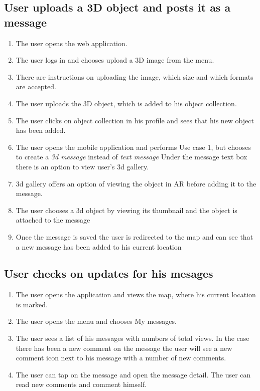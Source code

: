 \documentclass[thesis=M,english]{FITthesis}[2012/10/20]
\begin{document}
\subsection{User uploads a 3D object and posts it as a message}
\begin{enumerate}
	\item The user opens the web application.
	\item The user logs in and chooses upload a 3D image from the menu.
	\item There are instructions on uploading the image, which size and which formats are accepted.
	\item The user uploads the 3D object, which is added to his object collection.
	\item The user clicks on object collection in his profile and sees that his new object has been added.
	\item The user opens the mobile application and performs Use case 1, but chooses to create a \textit{3d message} instead of \textit{text message} Under the message text box there is an option to view user's 3d gallery.
	\item 3d gallery offers an option of viewing the object in AR before adding it to the message.
	\item The user chooses a 3d object by viewing its thumbnail and the object is attached to the message
	\item Once the message is saved the user is redirected to the map and can see that a new message has been added to his current location
\end{enumerate}

\subsection{User checks on updates for his mesages}
\begin{enumerate}
	\item The user opens the application and views the map, where his current location is marked.
	\item The user opens the menu and chooses My messages.
	\item The user sees a list of his messages with numbers of total views. In the case there has been a new comment on the message the user will see a new comment icon next to his message with a number of new comments.
	\item The user can tap on the message and open the message detail. The user can read new comments and comment himself.
\end{enumerate}
\end{document}
